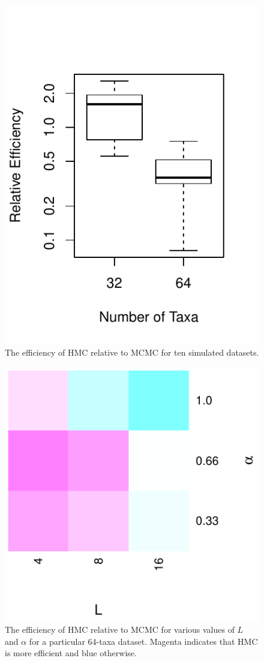 \documentclass{article}
\begin{document}
    \begin{figure}
        \centering
        \includegraphics[scale=0.8]{boxplot.pdf}
        \caption{The efficiency of \ac{HMC} relative to \ac{MCMC}
                    for ten simulated datasets.}
    \end{figure}
    \begin{figure}
        \centering
        \includegraphics[scale=0.8]{heatmap.pdf}
        \caption{The efficiency of \ac{HMC} relative to \ac{MCMC} for various
                 values of $L$ and $\alpha$ for a particular 64-taxa dataset.
                 Magenta indicates that \ac{HMC} is more efficient and blue
                 otherwise.}
    \end{figure}

    \printbibliography
\end{document}
